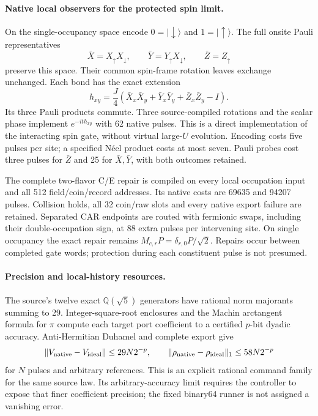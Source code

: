 \paragraph{Native local observers for the protected spin limit.}
On the single-occupancy space encode $0=\lvert\downarrow\rangle$ and
$1=\lvert\uparrow\rangle$. The full onsite Pauli representatives
\[
 \bar X=X_\uparrow X_\downarrow,\qquad
 \bar Y=Y_\uparrow X_\downarrow,\qquad \bar Z=Z_\uparrow
\]
preserve this space. Their common spin-frame rotation leaves exchange
unchanged. Each bond has the exact extension
\[
 h_{xy}=\frac J4(\bar X_x\bar X_y+\bar Y_x\bar Y_y+
                       \bar Z_x\bar Z_y-I).
\]
Its three Pauli products commute. Three source-compiled rotations and the
scalar phase implement $e^{-it h_{xy}}$ with 62 native pulses. This is a
direct implementation of the interacting spin gate, without virtual
large-$U$ evolution. Encoding costs five pulses per site; a specified
N\'eel product costs at most seven. Pauli probes cost three pulses for
$\bar Z$ and 25 for $\bar X,\bar Y$, with both outcomes retained.

The complete two-flavor C/E repair is compiled on every local occupation
input and all 512 field/coin/record addresses. Its native costs are 69635
and 94207 pulses. Collision holds, all 32 coin/raw slots and every native
export failure are retained. Separated CAR endpoints are routed with
fermionic swaps, including their double-occupation sign, at 88 extra pulses
per intervening site. On single occupancy the exact repair remains
$M_{c,r}P=\delta_{r,0}P/\sqrt2$. Repairs occur between completed gate words;
protection during each constituent pulse is not presumed.

\paragraph{Precision and local-history resources.}
The source's twelve exact $\mathbb Q(\sqrt5)$ generators have rational
norm majorants summing to 29. Integer-square-root enclosures and the Machin
arctangent formula for $\pi$ compute each target port coefficient to a
certified $p$-bit dyadic accuracy. Anti-Hermitian Duhamel and complete
export give
\[
 \|V_{\rm native}-V_{\rm ideal}\|\le29N2^{-p},\qquad
 \|\rho_{\rm native}-\rho_{\rm ideal}\|_1\le58N2^{-p}
\]
for $N$ pulses and arbitrary references. This is an explicit rational
command family for the same source law. Its arbitrary-accuracy limit
requires the controller to expose that finer coefficient precision;
the fixed binary64 runner is not assigned a vanishing error.

